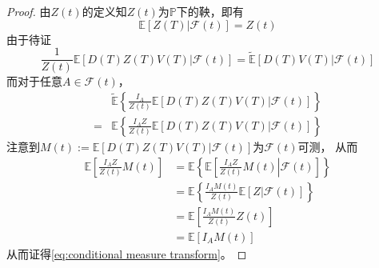 \documentclass[cn]{homework}
\newcommand{\E}{{\mathbb E}}
\begin{document}
    \problem[习题5.2]
    \begin{proof}
        由$Z(t)$的定义知$Z(t)$为$\mathbb P$下的鞅，即有
        \[\E[Z(T)|\mathcal F(t)]=Z(t)\]
        由于待证
        \begin{equation}
            \label{eq:conditional measure transform}
            \frac{1}{Z(t)}\E[D(T)Z(T)V(T)|\mathcal F(t)]=\tilde\E[D(T)V(T)|\mathcal F(t)]
        \end{equation}
        而对于任意$A\in\mathcal F(t)$，
        \[\begin{aligned}
            &\tilde\E\left\{\frac{I_A}{Z(t)}\E[D(T)Z(T)V(T)|\mathcal F(t)]\right\}\\
            =&\E\left\{\frac{I_AZ}{Z(t)}\E[D(T)Z(T)V(T)|\mathcal F(t)]\right\}
        \end{aligned}\]
        注意到$M(t):=\E[D(T)Z(T)V(T)|\mathcal F(t)]$为$\mathcal F(t)$可测，
        从而
        \[\begin{aligned}
            \E\left[\frac{I_AZ}{Z(t)}M(t)\right]
            &=\E\left\{\E\left[\left.\frac{I_AZ}{Z(t)}M(t)\right|\mathcal F(t)\right]\right\}\\
            &=\E\left\{\frac{I_AM(t)}{Z(t)}\E\left[Z|\mathcal F(t)\right]\right\}\\
            &=\E\left[\frac{I_AM(t)}{Z(t)}Z(t)\right]\\
            &=\E[I_AM(t)]
        \end{aligned}\]
        从而证得\cref{eq:conditional measure transform}。
    \end{proof}
\end{document}
